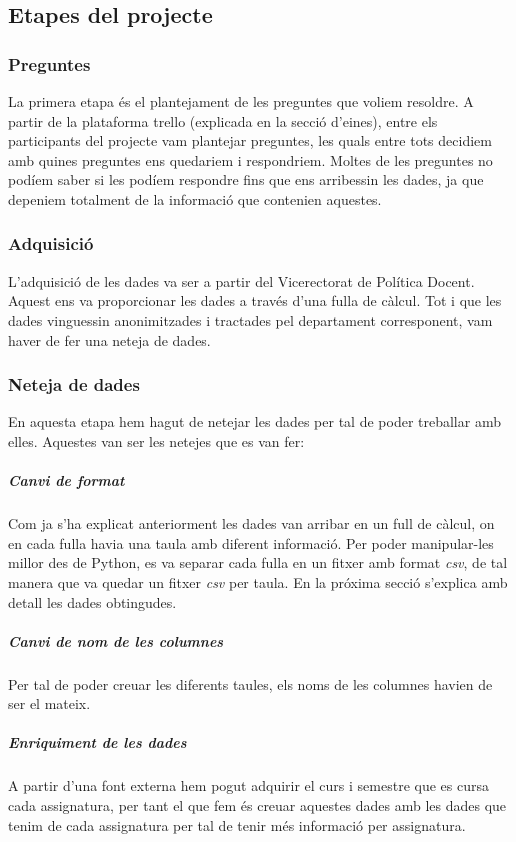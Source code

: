 \documentclass[12pt,a4paper,catalan]{article}
\begin{document}
\newpage

\subsection{Etapes del projecte}

\subsubsection{Preguntes}
La primera etapa és el plantejament de les preguntes que voliem resoldre. A partir de la plataforma trello (explicada en la secció d'eines), entre els participants del projecte vam plantejar preguntes, les quals entre tots decidiem amb quines preguntes ens quedariem i respondriem. Moltes de les preguntes no podíem saber si les podíem respondre fins que ens arribessin les dades, ja que depeniem totalment de la informació que contenien aquestes.

\subsubsection{Adquisició}
L'adquisició de les dades va ser a partir del Vicerectorat de Política Docent. Aquest ens va proporcionar les dades a través d'una fulla de càlcul. Tot i que les dades vinguessin anonimitzades i tractades pel departament corresponent, vam haver de fer una neteja de dades.

\subsubsection{Neteja de dades}
En aquesta etapa hem hagut de netejar les dades per tal de poder treballar amb elles. Aquestes van ser les netejes que es van fer:

\subparagraph{Canvi de format}
Com ja s'ha explicat anteriorment les dades van arribar en un full de càlcul, on en cada fulla havia una taula amb diferent informació. Per poder manipular-les millor des de Python, es va separar cada fulla en un fitxer amb format \textit{csv}, de tal manera que va quedar un fitxer \textit{csv} per taula. En la próxima secció s'explica amb detall les dades obtingudes.

\subparagraph{Canvi de nom de les columnes}
Per tal de poder creuar les diferents taules, els noms de les columnes havien de ser el mateix.

\subparagraph{Enriquiment de les dades}
A partir d'una font externa hem pogut adquirir el curs i semestre que es cursa cada assignatura, per tant el que fem és creuar aquestes dades amb les dades que tenim de cada assignatura per tal de tenir més informació per assignatura.
\end{document}
